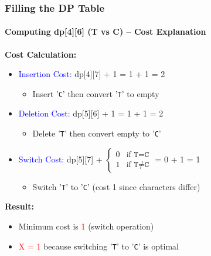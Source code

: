 \documentclass[10pt,aspectratio=43]{beamer}
\begin{document}
\begin{frame}
\frametitle{Filling the DP Table}
\framesubtitle{Computing dp[4][6] (T vs C) – Cost Explanation}

\textbf{Cost Calculation:}
\begin{itemize}
    \item \textcolor{blue}{Insertion Cost:} dp[4][7] + 1 = 1 + 1 = 2
    \begin{itemize}
        \scriptsize
        \item Insert '\texttt{C}' then convert '\texttt{T}' to empty
    \end{itemize}
    
    \item \textcolor{blue}{Deletion Cost:} dp[5][6] + 1 = 1 + 1 = 2
    \begin{itemize}
        \scriptsize
        \item Delete '\texttt{T}' then convert empty to '\texttt{C}'
    \end{itemize}
    
    \item \textcolor{blue}{Switch Cost:} dp[5][7] + 
    $\begin{cases}
        0 & \text{if } \texttt{T} = \texttt{C} \\
        1 & \text{if } \texttt{T} \neq \texttt{C}
    \end{cases}$ = 0 + 1 = 1
    \begin{itemize}
        \scriptsize
        \item Switch '\texttt{T}' to '\texttt{C}' (cost 1 since characters differ)
    \end{itemize}
\end{itemize}

\vspace{0.3cm}
\textbf{Result:}
\begin{itemize}
    \item Minimum cost is \textcolor{red}{1} (switch operation)
    \item \textcolor{red}{X = 1} because switching '\texttt{T}' to '\texttt{C}' is optimal
\end{itemize}
\end{frame}
\end{document}
